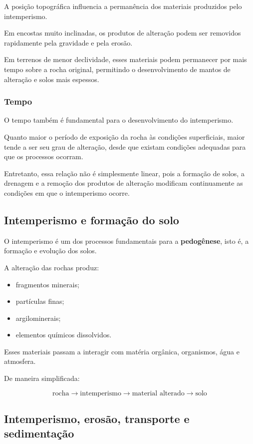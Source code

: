 A posição topográfica influencia a permanência dos materiais produzidos pelo intemperismo.

Em encostas muito inclinadas, os produtos de alteração podem ser removidos rapidamente pela gravidade e pela erosão.

Em terrenos de menor declividade, esses materiais podem permanecer por mais tempo sobre a rocha original, permitindo o desenvolvimento de mantos de alteração e solos mais espessos.

\subsubsection{Tempo}

O tempo também é fundamental para o desenvolvimento do intemperismo.

Quanto maior o período de exposição da rocha às condições superficiais, maior tende a ser seu grau de alteração, desde que existam condições adequadas para que os processos ocorram.

Entretanto, essa relação não é simplesmente linear, pois a formação de solos, a drenagem e a remoção dos produtos de alteração modificam continuamente as condições em que o intemperismo ocorre.

\subsection{Intemperismo e formação do solo}

O intemperismo é um dos processos fundamentais para a \textbf{pedogênese}, isto é, a formação e evolução dos solos.

A alteração das rochas produz:

\begin{itemize}
    \item fragmentos minerais;
    \item partículas finas;
    \item argilominerais;
    \item elementos químicos dissolvidos.
\end{itemize}

Esses materiais passam a interagir com matéria orgânica, organismos, água e atmosfera.

De maneira simplificada:

\[
\boxed{
\text{rocha}
\rightarrow
\text{intemperismo}
\rightarrow
\text{material alterado}
\rightarrow
\text{solo}
}
\]

\subsection{Intemperismo, erosão, transporte e sedimentação}

